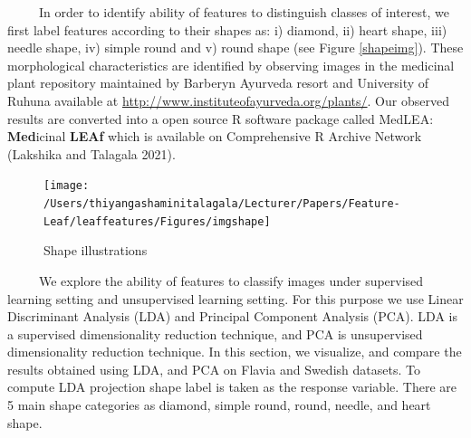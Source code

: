 \documentclass{article}
\begin{document}
~~~~~In order to identify ability of features to distinguish classes of
interest, we first label features according to their shapes as: i)
diamond, ii) heart shape, iii) needle shape, iv) simple round and v)
round shape (see Figure \ref{shapeimg}). These morphological
characteristics are identified by observing images in the medicinal
plant repository maintained by Barberyn Ayurveda resort and University
of Ruhuna available at \url{http://www.instituteofayurveda.org/plants/}.
Our observed results are converted into a open source R software package
called MedLEA: \textbf{Med}icinal \textbf{LEAf} which is available on
Comprehensive R Archive Network (Lakshika and Talagala 2021).

\begin{figure}[!ht]

{\centering \texttt{[image: /Users/thiyangashaminitalagala/Lecturer/Papers/Feature-Leaf/leaffeatures/Figures/imgshape]} 

}

\caption{\label{shapeimg}Shape illustrations}\label{fig:unnamed-chunk-39}
\end{figure}

~~~~~We explore the ability of features to classify images under
supervised learning setting and unsupervised learning setting. For this
purpose we use Linear Discriminant Analysis (LDA) and Principal
Component Analysis (PCA). LDA is a supervised dimensionality reduction
technique, and PCA is unsupervised dimensionality reduction technique.
In this section, we visualize, and compare the results obtained using
LDA, and PCA on Flavia and Swedish datasets. To compute LDA projection
shape label is taken as the response variable. There are 5 main shape
categories as diamond, simple round, round, needle, and heart shape.
\end{document}
